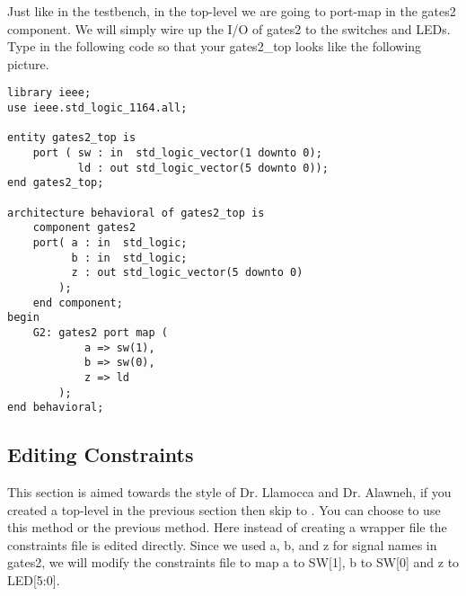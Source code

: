 \begin{center}
\end{center}

Just like in the testbench, in the top-level we are going to port-map in the gates2 component.
We will simply wire up the I/O of gates2 to the switches and LEDs.
Type in the following code so that your gates2\_top looks like the following picture.

\begin{center}
\begin{minipage}{\textwidth}
\begin{verbatim}
library ieee;
use ieee.std_logic_1164.all;

entity gates2_top is
    port ( sw : in  std_logic_vector(1 downto 0);
           ld : out std_logic_vector(5 downto 0));
end gates2_top;

architecture behavioral of gates2_top is
    component gates2
    port( a : in  std_logic;
          b : in  std_logic;
          z : out std_logic_vector(5 downto 0)
        );
    end component;
begin
    G2: gates2 port map (
            a => sw(1),
            b => sw(0),
            z => ld
        );
end behavioral;
\end{verbatim}
\end{minipage}
\end{center}

\subsection{Editing Constraints}
\label{sec:constraints}
This section is aimed towards the style of Dr. Llamocca and Dr. Alawneh, if you created a top-level in the
previous section then skip to .
You can choose to use this method or the previous  method.
Here instead of creating a wrapper file the constraints file is edited directly.
Since we used a, b, and z for signal names in gates2, we will modify the constraints file to
map a to SW[1], b to SW[0] and z to LED[5:0].

